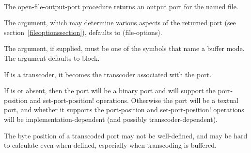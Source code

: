 \begin{entry}{%
\\
}


The {\cf open-file-output-port} procedure returns an output port for the named file.

The  argument, which may determine
various aspects of the returned port (see section~\ref{fileoptionssection}),
defaults to {\cf (file-options)}.

The  argument, if supplied,
must be one of the symbols that name a buffer mode.
The  argument defaults to {\cf block}.

If  is a transcoder, it becomes the transcoder
associated with the port.

If  is \schfalse{} or absent,
then the port will be a binary port and will support the
{\cf port-position} and {\cf set-port-position!}  operations.
Otherwise the port will be a textual port, and whether it supports
the {\cf port-position} and {\cf set-port-position!} operations
will be implementation-dependent (and possibly transcoder-dependent).

\begin{rationale}
  The byte position of a transcoded port may not be
  well-defined, and may be hard to calculate even when defined,
  especially when transcoding is buffered.
\end{rationale}
\end{entry}   

